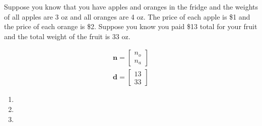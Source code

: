 Suppose you know that you have apples and oranges in the fridge and the weights of all apples are 3 oz and all oranges are 4 oz. The price of each apple is \$1 and the price of each orange is \$2. Suppose you know you paid \$13 total for your fruit and the total weight of the fruit is 33 oz. 

\begin{align*}
    \boldsymbol{n} = \begin{bmatrix}
        n_o \\ n_a
    \end{bmatrix} \\
    \boldsymbol{d} = \begin{bmatrix}
        13 \\ 33
    \end{bmatrix}
\end{align*}

\begin{enumerate}
    \item 
    \item 
    \item 
\end{enumerate}
